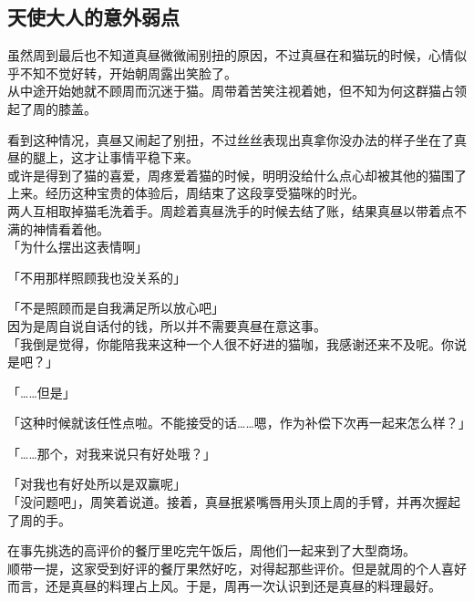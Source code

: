 \subsection{天使大人的意外弱点}

虽然周到最后也不知道真昼微微闹别扭的原因，不过真昼在和猫玩的时候，心情似乎不知不觉好转，开始朝周露出笑脸了。\\

从中途开始她就不顾周而沉迷于猫。周带着苦笑注视着她，但不知为何这群猫占领起了周的膝盖。

看到这种情况，真昼又闹起了别扭，不过丝丝表现出真拿你没办法的样子坐在了真昼的腿上，这才让事情平稳下来。\\

或许是得到了猫的喜爱，周疼爱着猫的时候，明明没给什么点心却被其他的猫围了上来。经历这种宝贵的体验后，周结束了这段享受猫咪的时光。\\

两人互相取掉猫毛洗着手。周趁着真昼洗手的时候去结了账，结果真昼以带着点不满的神情看着他。\\

「为什么摆出这表情啊」

「不用那样照顾我也没关系的」

「不是照顾而是自我满足所以放心吧」\\

因为是周自说自话付的钱，所以并不需要真昼在意这事。\\

「我倒是觉得，你能陪我来这种一个人很不好进的猫咖，我感谢还来不及呢。你说是吧？」

「……但是」

「这种时候就该任性点啦。不能接受的话……嗯，作为补偿下次再一起来怎么样？」

「……那个，对我来说只有好处哦？」

「对我也有好处所以是双赢呢」\\

「没问题吧」，周笑着说道。接着，真昼抿紧嘴唇用头顶上周的手臂，并再次握起了周的手。\\

\vspace{2\baselineskip}

在事先挑选的高评价的餐厅里吃完午饭后，周他们一起来到了大型商场。\\

顺带一提，这家受到好评的餐厅果然好吃，对得起那些评价。但是就周的个人喜好而言，还是真昼的料理占上风。于是，周再一次认识到还是真昼的料理最好。\\

